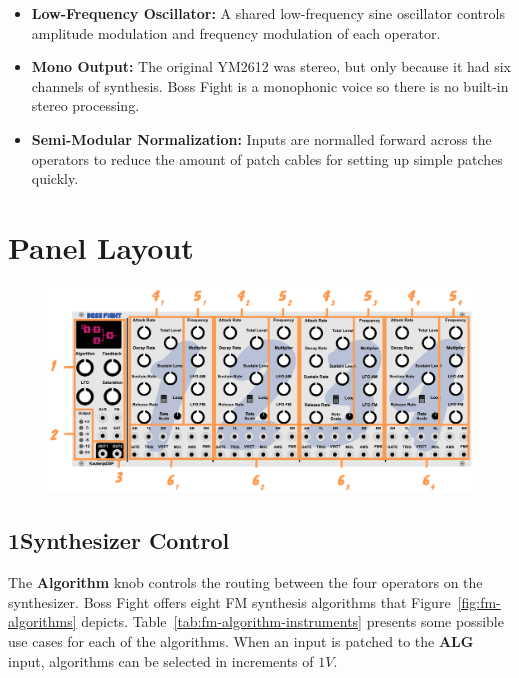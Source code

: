 \documentclass[12pt,letter]{article}
\begin{document}
\begin{itemize}
  \item \textbf{Low-Frequency Oscillator:} A shared low-frequency sine oscillator controls amplitude modulation and frequency modulation of each operator.
  \item \textbf{Mono Output:} The original YM2612 was stereo, but only because it had six channels of synthesis. Boss Fight is a monophonic voice so there is no built-in stereo processing.
  \item \textbf{Semi-Modular Normalization:} Inputs are normalled forward across the operators to reduce the amount of patch cables for setting up simple patches quickly.
\end{itemize}


\clearpage
\section*{Panel Layout}

\begin{figure}[!htp]
\centering
\includegraphics[width=\maxwidth{\textwidth}]{Interface}
\end{figure}

\subsection*{1{\quad}Synthesizer Control}

The \textbf{Algorithm} knob controls the routing between the four operators on the synthesizer. Boss Fight offers eight FM synthesis algorithms that Figure~\ref{fig:fm-algorithms} depicts. Table~\ref{tab:fm-algorithm-instruments} presents some possible use cases for each of the algorithms. When an input is patched to the \textbf{ALG} input, algorithms can be selected in increments of $1V$.
\end{document}

